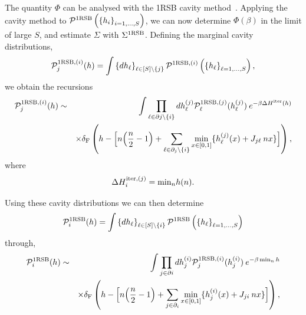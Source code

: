 \documentclass[11pt,a4paper]{article}
\begin{document}
The quantity $\Phi$ can  be analysed  with the 1RSB cavity method~\cite{mezard2001bethe,mezard2003cavity}.      
Applying the cavity method to $\mathcal{P}^{\rm 1RSB}\left(\left\{h_i\right\}_{i=1,\ldots,S}\right) $, we can now determine $\Phi(\beta)$ in the limit of large $S$, and estimate $\Sigma$ with $\Sigma^{1{\rm RSB}}$.       Defining the marginal cavity distributions, 
\begin{equation}
\mathcal{P}^{{\rm 1RSB},(i)}_j(h) =  \int \left\{dh_\ell\right\}_{\ell\in [S]\setminus \left\{j\right\}} \mathcal{P}^{{\rm 1RSB},(i)}\left(\left\{h_\ell\right\}_{\ell=1,\ldots,S}\right), 
\end{equation}
we obtain the recursions 
\begin{eqnarray}
\mathcal{P}^{{\rm 1RSB}, (i)}_j(h)  & \sim&  \int \prod_{\ell\in \partial j\setminus\left\{i\right\}} dh^{(j)}_\ell \mathcal{P}^{{\rm 1RSB}, (j)}_\ell(h^{(j)}_\ell) \:  e^{-\beta \Delta H^{\rm iter}(h)}
\nonumber\\ 
&& \times \delta_{\rm F}\left(  h - \Big[ n\!\left(\frac{n}{2}-1\right)
      + \sum_{\ell\in \partial_j \setminus\left\{i\right\}} \min_{x\in[0,1]}\{h^{(j)}_\ell(x)+J_{j\ell} \:  n x\}\Big]\right) ,
\end{eqnarray}
where 
\begin{equation}
\Delta H^{{\rm iter}, {(j)}}_i = {\rm min}_n  h(n).
\end{equation}


Using these cavity distributions we can then determine 
\begin{equation}
\mathcal{P}^{\rm 1RSB}_i(h) =  \int \left\{dh_\ell\right\}_{\ell\in [S]\setminus\left\{i\right\}} \mathcal{P}^{\rm 1RSB}\left(\left\{h_\ell\right\}_{\ell=1,\ldots,S}\right) 
\end{equation}
through, 
\begin{eqnarray}
\mathcal{P}^{{\rm 1RSB}}_i(h)  & \sim&  \int \prod_{j\in \partial i} dh^{(i)}_j \mathcal{P}^{{\rm 1RSB}, (i)}_j(h^{(i)}_j) \: e^{-\beta \min_n h}
\nonumber\\ 
&& \times \delta_{\rm F}\left(  h - \Big[ n\!\left(\frac{n}{2}-1\right)
      + \sum_{j\in \partial_i } \min_{x\in[0,1]}\{h^{(i)}_j(x)+J_{ji} \:  n x\}\Big]\right),
\end{eqnarray}
\end{document}
